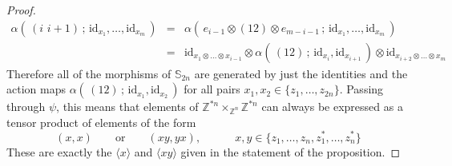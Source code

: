\documentclass{amsbook} %
\newcommand{\id}{\textrm{id}}
\numberwithin{section}{chapter}
\begin{document}
\begin{proof}
\[ \begin{array}{rll}
			\alpha( \, (i \, \, i+1) \, ; \, \id_{x_1}, \ldots, \id_{x_m} \, ) & = & \alpha( \, e_{i-1} \otimes (1 2) \otimes e_{m-i-1} \, ; \,  \id_{x_1}, \ldots, \id_{x_m} \, ) \\
			& = & \id_{x_1 \otimes \ldots \otimes x_{i-1}} \otimes \alpha( \, (1 2) \, ; \, \id_{x_i}, \id_{x_{i+1}} \, ) \otimes \id_{x_{i+2} \otimes \ldots \otimes x_m}
		\end{array}
\]
Therefore all of the morphisms of $\mathbb{S}_{2n}$ are generated by just the identities and the action maps $\alpha( \, (1 2) \, ; \, \id_{x_1}, \id_{x_2} \, )$ for all pairs $x_1, x_2 \in \{z_1, \ldots, z_{2n} \}$. Passing through $\psi$, this means that elements of $\mathbb{Z}^{\ast n} \times_{\mathbb{Z}^n} \mathbb{Z}^{\ast n}$ can always be expressed as a tensor product of elements of the form
\[ (x, x) \quad \quad \text{or} \quad \quad (x y, y x), \quad \quad \quad x, y \in \{z_1, \ldots, z_n, z_1^*, \ldots, z_n^* \} \]
These are exactly the $\langle x \rangle$ and $\langle xy \rangle$ given in the statement of the proposition.


\end{proof}
\end{document}
